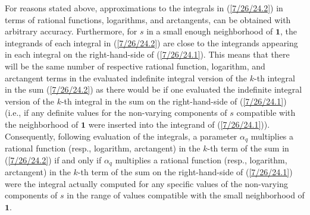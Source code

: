 \documentclass{amsart}
\numberwithin{equation}{section}
\theoremstyle{definition}
\numberwithin{theorem}{section}
\begin{document}
For reasons stated above, approximations to the integrals in (\ref{7/26/24.2}) in terms of rational functions, logarithms, and arctangents, can be obtained with arbitrary accuracy.  Furthermore, for $s$ in a small enough neighborhood of $\mathbf{1}$, the integrands of each integral in (\ref{7/26/24.2}) are close to the integrands appearing in each integral on the right-hand-side of (\ref{7/26/24.1}).  This means that there will be the same number of respective rational function, logarithm, and arctangent terms in the evaluated indefinite integral version of the $k$-th integral in the sum (\ref{7/26/24.2}) as there would be if one evaluated the indefinite integral version of the $k$-th integral in the sum on the right-hand-side of (\ref{7/26/24.1}) (i.e., if any definite values for the non-varying components of $s$ compatible with the neighborhood of $\mathbf{1}$ were inserted into the integrand of (\ref{7/26/24.1})).  Consequently, following evaluation of the integrals, a parameter $\alpha_q$ multiplies a rational function (resp., logarithm, arctangent) in the $k$-th term of the sum in (\ref{7/26/24.2}) if and only if $\alpha_q$ multiplies a rational function (resp., logarithm, arctangent) in the $k$-th term of the sum on the right-hand-side of (\ref{7/26/24.1}) were the integral actually computed for any specific values of the non-varying components of $s$ in the range of values compatible with the small neighborhood of $\mathbf{1}$.  
\end{document}

